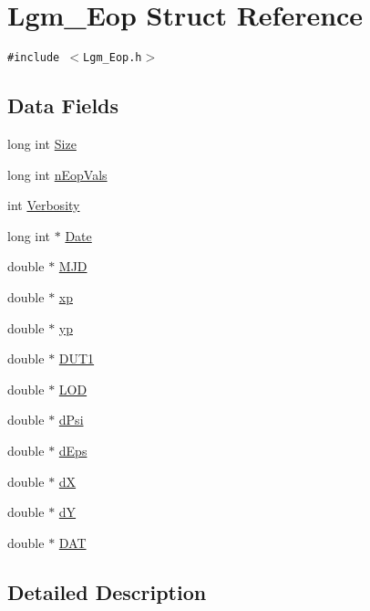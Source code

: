 \hypertarget{struct_lgm___eop}{
\section{Lgm\_\-Eop Struct Reference}
\label{struct_lgm___eop}
}
{\tt \#include $<$Lgm\_\-Eop.h$>$}

\subsection*{Data Fields}
\begin{CompactItemize}
\item 
long int \hyperlink{struct_lgm___eop_df3e4152cca72754e6f609e8b6804815}{Size}
\item 
long int \hyperlink{struct_lgm___eop_09c8bc9f75b8c57858e440f78d54e1ed}{nEopVals}
\item 
int \hyperlink{struct_lgm___eop_b00944552a5ef41ef0c18de744dd8207}{Verbosity}
\item 
long int $\ast$ \hyperlink{struct_lgm___eop_8883a8c4c898cf0f1a1975081bc3974d}{Date}
\item 
double $\ast$ \hyperlink{struct_lgm___eop_fc3345d3a68ac61c1f7f989d70fbfd49}{MJD}
\item 
double $\ast$ \hyperlink{struct_lgm___eop_7df365c58843453a02cae2d62640973b}{xp}
\item 
double $\ast$ \hyperlink{struct_lgm___eop_ac4115a8887b9279e971e048bfb884cf}{yp}
\item 
double $\ast$ \hyperlink{struct_lgm___eop_d6fc3c97f5535af67f2197e9d52ea69a}{DUT1}
\item 
double $\ast$ \hyperlink{struct_lgm___eop_91322cde3538911ebb7cf286c4ef7820}{LOD}
\item 
double $\ast$ \hyperlink{struct_lgm___eop_dd3e57915cc3b1840af16e8c18f1d17f}{dPsi}
\item 
double $\ast$ \hyperlink{struct_lgm___eop_465a734a94263632e10d3a896a4a9f7c}{dEps}
\item 
double $\ast$ \hyperlink{struct_lgm___eop_0087eb05b233aa7acf75393dc834f714}{dX}
\item 
double $\ast$ \hyperlink{struct_lgm___eop_2bc7a161be9eb4c71afcd0985fe31f13}{dY}
\item 
double $\ast$ \hyperlink{struct_lgm___eop_ca841ff617939856d783aa63d835b31c}{DAT}
\end{CompactItemize}


\subsection{Detailed Description}


